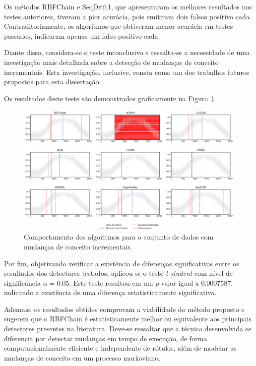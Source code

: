 \documentclass[msc, classic, a4paper]{ufbathesis}
\begin{document}
Os métodos RBFChain e SeqDrift1, que apresentaram os melhores resultados nos testes anteriores, tiveram a pior acurácia, pois emitiram dois falsos positivo cada.
Contraditoriamente, os algoritmos que obtiveram menor acurácia em testes passados, indicaram apenas um falso positivo cada.

Diante disso, considera-se o teste inconclusivo e ressalta-se a necessidade de uma investigação mais detalhada sobre a detecção de mudanças de conceito incrementais. Esta investigação, inclusive, consta como um dos trabalhos futuros propostos para esta dissertação.

Os resultados deste teste são demonstrados graficamente na Figura \ref{fig:exp_incremental}.

\begin{landscape}
\begin{figure}[ht]
\begin{center}
    \includegraphics[scale=0.65]{imagens/incremental.png}
    \caption{Comportamento dos algoritmos para o conjunto de dados com mudanças de conceito incrementais.}
    \label{fig:exp_incremental}
\end{center}
\end{figure}
\end{landscape}

Por fim, objetivando verificar a existência de diferenças significativas entre os resultados dos detectores testados, aplicou-se o teste \textit{t-student} com nível de significância $\alpha = 0.05$. Este teste resultou em um \textit{p} valor igual a $0.0007587$, indicando a existência de uma diferença estatisticamente significativa.

Ademais, os resultados obtidos comprovam a viabilidade do método proposto e sugerem que o RBFChain é estatisticamente melhor ou equivalente aos principais detectores presentes na literatura.
Deve-se ressaltar que a técnica desenvolvida se diferencia por detectar mudanças em tempo de execução, de forma computacionalmente eficiente e independente de rótulos, além de modelar as mudanças de conceito em um processo markoviano.
\end{document}
